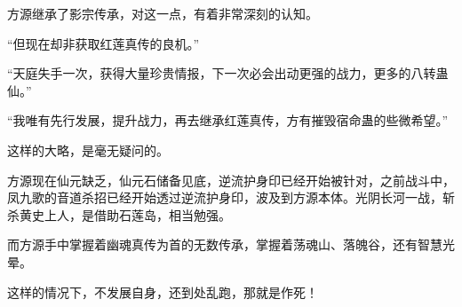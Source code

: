 \begin{this_body}
方源继承了影宗传承，对这一点，有着非常深刻的认知。

“但现在却非获取红莲真传的良机。”

“天庭失手一次，获得大量珍贵情报，下一次必会出动更强的战力，更多的八转蛊仙。”

“我唯有先行发展，提升战力，再去继承红莲真传，方有摧毁宿命蛊的些微希望。”

这样的大略，是毫无疑问的。

方源现在仙元缺乏，仙元石储备见底，逆流护身印已经开始被针对，之前战斗中，凤九歌的音道杀招已经开始透过逆流护身印，波及到方源本体。光阴长河一战，斩杀黄史上人，是借助石莲岛，相当勉强。

而方源手中掌握着幽魂真传为首的无数传承，掌握着荡魂山、落魄谷，还有智慧光晕。

这样的情况下，不发展自身，还到处乱跑，那就是作死！

\end{this_body}

